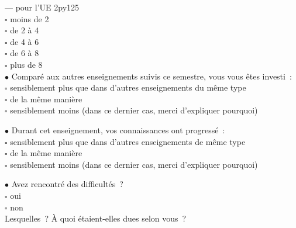 \documentclass[10pt]{letter}
\begin{document}
--- pour l'UE 2py125 \\
$\square$ moins de 2 \\
$\square$ de 2 à 4 \\
$\square$ de 4 à 6 \\
$\square$ de 6 à 8 \\
$\square$ plus de 8 \\


$\bullet$ Comparé aux autres enseignements suivis ce semestre, vous vous êtes investi : \\
$\square$ sensiblement plus que dans d’autres enseignements du même type \\
$\square$ de la même manière \\
$\square$ sensiblement moins (dans ce dernier cas, merci d’expliquer pourquoi) \\
\vspace{1.0cm}


$\bullet$ Durant cet enseignement, vos connaissances ont progressé : \\
$\square$ sensiblement plus que dans d’autres enseignements de même type \\
$\square$ de la même manière \\
$\square$ sensiblement moins (dans ce dernier cas, merci d’expliquer pourquoi) \\
\vspace{1.0cm}


$\bullet$ Avez rencontré des difficultés ? \\
$\square$ oui \\
$\square$ non \\
Lesquelles ? À quoi étaient-elles dues selon vous ? \\
\vspace{1.0cm}
\end{document}
